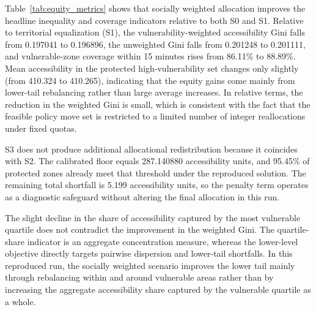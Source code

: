 \documentclass[final,5p,times,twocolumn,authoryear]{elsarticle}
\begin{document}
Table~\ref{tab:equity_metrics} shows that socially weighted allocation improves the headline
inequality and coverage indicators relative to both S0 and S1. Relative to territorial
equalization (S1), the
vulnerability-weighted accessibility Gini falls from 0.197041 to 0.196896, the unweighted
Gini falls from 0.201248 to 0.201111, and vulnerable-zone coverage within 15 minutes rises
from 86.11\% to 88.89\%. Mean accessibility in the protected high-vulnerability set changes
only slightly (from 410.324 to 410.265), indicating that the equity gains come mainly from
lower-tail rebalancing rather than large average increases. In relative terms, the reduction
in the weighted Gini is small, which is consistent with the fact that the feasible policy
move set is restricted to a limited number of integer reallocations under fixed quotas.

S3 does not produce additional allocational redistribution because it coincides with S2. The
calibrated floor equals 287.140880 accessibility units, and 95.45\% of protected zones
already meet that threshold under the reproduced solution. The remaining total shortfall is
5.199 accessibility units, so the penalty term operates as a diagnostic safeguard without
altering the final allocation in this run.

The slight decline in the share of accessibility captured by the most vulnerable quartile does
not contradict the improvement in the weighted Gini. The quartile-share indicator is an
aggregate concentration measure, whereas the lower-level objective directly targets pairwise
dispersion and lower-tail shortfalls. In this reproduced run, the socially weighted scenario
improves the lower tail mainly through rebalancing within and around vulnerable areas rather
than by increasing the aggregate accessibility share captured by the vulnerable quartile as a
whole.
\end{document}
